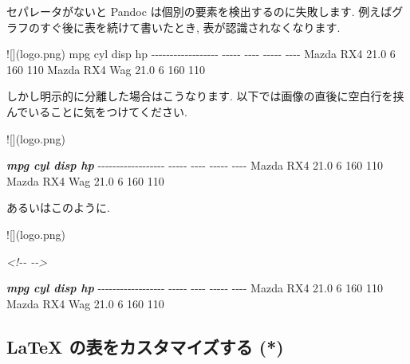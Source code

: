 \documentclass[
  11pt,
  lualatex,
  ja=standard]{bxjsreport}
\newenvironment{Shaded}{\begin{snugshade}}{\end{snugshade}}
\newcommand{\AlertTok}[1]{\textcolor[rgb]{0.94,0.16,0.16}{#1}}
\newcommand{\CommentTok}[1]{\textcolor[rgb]{0.56,0.35,0.01}{\textit{#1}}}
\newcommand{\InformationTok}[1]{\textcolor[rgb]{0.56,0.35,0.01}{\textbf{\textit{#1}}}}
\newcommand{\NormalTok}[1]{#1}
\begin{document}
セパレータがないと Pandoc は個別の要素を検出するのに失敗します. 例えばグラフのすぐ後に表を続けて書いたとき, 表が認識されなくなります.

\begin{Shaded}
\begin{Highlighting}[]
\AlertTok{![](logo.png)}
\NormalTok{                      mpg   cyl   disp    hp}
\NormalTok{{-}{-}{-}{-}{-}{-}{-}{-}{-}{-}{-}{-}{-}{-}{-}{-}{-}{-}  {-}{-}{-}{-}{-}  {-}{-}{-}{-}  {-}{-}{-}{-}{-}  {-}{-}{-}{-}}
\NormalTok{Mazda RX4            21.0     6    160   110}
\NormalTok{Mazda RX4 Wag        21.0     6    160   110}
\end{Highlighting}
\end{Shaded}

しかし明示的に分離した場合はこうなります. 以下では画像の直後に空白行を挟んでいることに気をつけてください.

\begin{Shaded}
\begin{Highlighting}[]
\AlertTok{![](logo.png)}

\InformationTok{                      mpg   cyl   disp    hp}
\NormalTok{{-}{-}{-}{-}{-}{-}{-}{-}{-}{-}{-}{-}{-}{-}{-}{-}{-}{-}  {-}{-}{-}{-}{-}  {-}{-}{-}{-}  {-}{-}{-}{-}{-}  {-}{-}{-}{-}}
\NormalTok{Mazda RX4            21.0     6    160   110}
\NormalTok{Mazda RX4 Wag        21.0     6    160   110}
\end{Highlighting}
\end{Shaded}

あるいはこのように.

\begin{Shaded}
\begin{Highlighting}[]
\AlertTok{![](logo.png)}

\CommentTok{\textless{}!{-}{-} {-}{-}\textgreater{}}

\InformationTok{                      mpg   cyl   disp    hp}
\NormalTok{{-}{-}{-}{-}{-}{-}{-}{-}{-}{-}{-}{-}{-}{-}{-}{-}{-}{-}  {-}{-}{-}{-}{-}  {-}{-}{-}{-}  {-}{-}{-}{-}{-}  {-}{-}{-}{-}}
\NormalTok{Mazda RX4            21.0     6    160   110}
\NormalTok{Mazda RX4 Wag        21.0     6    160   110}
\end{Highlighting}
\end{Shaded}

\hypertarget{customize-latex-tables}{%
\subsection{LaTeX の表をカスタマイズする (*)}\label{customize-latex-tables}}
\end{document}

